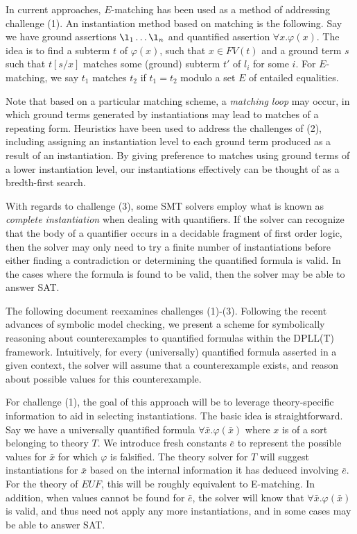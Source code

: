 \documentclass{llncs}
\begin{document}
In current approaches, $E$-matching has been used as a method of addressing challenge (1).
An instantiation method based on matching is the following.
Say we have ground assertions $\l_1 \ldots \l_n$ and quantified assertion $\forall x. \varphi(x)$.
The idea is to find a subterm $t$ of $\varphi(x)$, such that $x \in FV( t )$ and a ground term $s$ such that $t[s/x]$ matches some (ground) subterm $t'$ of $l_i$ for some $i$.
For $E$-matching, we say $t_1$ matches $t_2$ if $t_1 = t_2$ modulo a set $E$ of entailed equalities.

Note that based on a particular matching scheme, a \emph{matching loop} may occur, in which ground terms generated by instantiations may lead to matches of a repeating form.
Heuristics have been used to address the challenges of (2), including assigning an instantiation level to each ground term produced as a result of an instantiation.
By giving preference to matches using ground terms of a lower instantiation level, our instantiations effectively can be thought of as a bredth-first search.

With regards to challenge (3), some SMT solvers employ what is known as \emph{complete instantiation} when dealing with quantifiers.
If the solver can recognize that the body of a quantifier occurs in a decidable fragment of first order logic, then the solver may only need to try a finite number of instantiations before either finding a contradiction or determining the quantified formula is valid.
In the cases where the formula is found to be valid, then the solver may be able to answer SAT.

The following document reexamines challenges (1)-(3).
Following the recent advances of symbolic model checking, we present a scheme for symbolically reasoning about counterexamples to quantified formulas within the DPLL(T) framework.
Intuitively, for every (universally) quantified formula asserted in a given context, the solver will assume that a counterexample exists, and reason about possible values for this counterexample.

For challenge (1), the goal of this approach will be to leverage theory-specific information to aid in selecting instantiations.
The basic idea is straightforward.
Say we have a universally quantified formula $\forall \bar{x}. \varphi( \bar{x} )$ where $x$ is of a sort belonging to theory $T$.
We introduce fresh constants $\bar{e}$ to represent the possible values for $\bar{x}$ for which $\varphi$ is falsified.
The theory solver for $T$ will suggest instantiations for $\bar{x}$ based on the internal information it has deduced involving $\bar{e}$.
For the theory of $EUF$, this will be roughly equivalent to E-matching.
In addition, when values cannot be found for $\bar{e}$, the solver will know that $\forall \bar{x}. \varphi( \bar{x} )$ is valid, and thus need not apply any more instantiations, and in some cases may be able to answer SAT.
\end{document}
